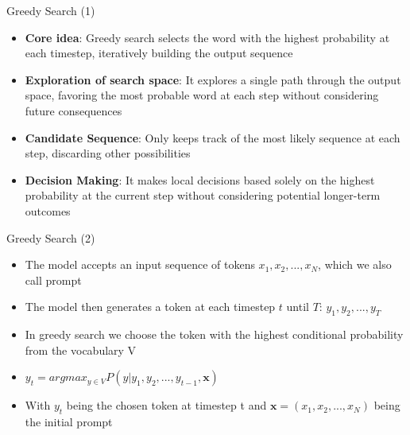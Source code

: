 \documentclass[11pt,compress,t,notes=noshow, xcolor=table]{beamer}
\begin{document}


\begin{frame}{Greedy Search (1)}

\vfill

\begin{itemize}
    \item \textbf{Core idea}: Greedy search selects the word with the highest probability at each timestep, iteratively building the output sequence
    \item \textbf{Exploration of search space}: It explores a single path through the output space, favoring the most probable word at each step without considering future consequences
    \item \textbf{Candidate Sequence}: Only keeps track of the most likely sequence at each step, discarding other possibilities
    \item \textbf{Decision Making}: It makes local decisions based solely on the highest probability at the current step without considering potential longer-term outcomes
\end{itemize}

\vfill
    
\end{frame}


\begin{frame}{Greedy Search (2)}

\vfill

\begin{itemize}
    \item The model accepts an input sequence of tokens $x_1, x_2,...,x_N$, which we also call prompt
    \item The model then generates a token at each timestep $t$ until $T$: $y_1,y_2,...,y_T$
    \item In greedy search we choose the token with the highest conditional probability from the vocabulary V
    \item $y_t = argmax_{y \in V}P(y|y_1,y_2,...,y_{t-1},\mathbf{x})$
    \item With $y_t$ being the chosen token at timestep t and $\mathbf{x} = (x_1, x_2,...,x_N)$ being the initial prompt
\end{itemize}

\vfill

\end{frame}
\end{document}
